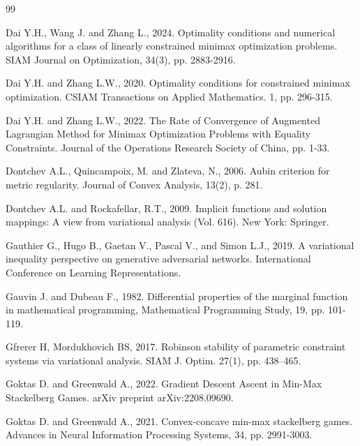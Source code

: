\documentclass[11pt]{article}
\numberwithin{equation}{section}
\begin{document}
{\begin{thebibliography}{99}

  Dai Y.H., Wang J. and Zhang L., 2024. Optimality conditions and numerical algorithms for a class of linearly constrained minimax optimization problems. SIAM Journal on Optimization, 34(3), pp. 2883-2916.

  Dai Y.H. and Zhang L.W., 2020. Optimality conditions for constrained minimax optimization. CSIAM Transactions on Applied Mathematics. 1, pp. 296-315.

  Dai Y.H. and Zhang L.W., 2022. The Rate of Convergence of Augmented Lagrangian Method for Minimax Optimization Problems with Equality Constraints. Journal of the Operations Research Society of China, pp. 1-33.

  Dontchev A.L., Quincampoix, M. and Zlateva, N., 2006. Aubin criterion for metric regularity. Journal of Convex Analysis, 13(2), p. 281.

 Dontchev A.L. and Rockafellar, R.T., 2009. Implicit functions and solution mappings: A view from variational analysis (Vol. 616). New York: Springer.



 Gauthier G., Hugo B., Gaetan V., Pascal V., and Simon L.J., 2019. A variational inequality perspective on generative adversarial networks. International Conference on Learning Representations.

 Gauvin J. and Dubeau F., 1982. Differential properties of the marginal function in mathematical programming, Mathematical Programming Study, 19, pp. 101-119.

 Gfrerer H, Mordukhovich BS, 2017. Robinson stability of parametric constraint systems via variational analysis. SIAM J. Optim. 27(1), pp.
438–465.

 Goktas D. and Greenwald A., 2022. Gradient Descent Ascent in Min-Max Stackelberg Games. arXiv preprint arXiv:2208.09690.

 Goktas D. and Greenwald A., 2021. Convex-concave min-max stackelberg games. Advances in Neural Information Processing Systems, 34, pp. 2991-3003.


\end{thebibliography}}
\end{document}
